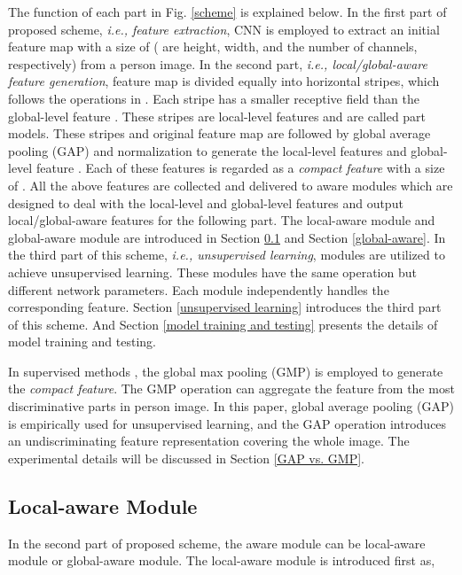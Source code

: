 \documentclass{cta-author}
\begin{document}
	The function of each part in Fig. \ref{scheme} is explained below. In the first part of proposed scheme, \textit{i.e., feature extraction}, CNN is employed to extract an initial feature map  with a size of  ( are height, width, and the number of channels, respectively) from a person image. In the second part, \textit{i.e., local/global-aware feature generation}, feature map  is divided equally into  horizontal stripes, which follows the operations in \cite{RN191} \cite{RN314} \cite{RN448}. Each stripe has a smaller receptive field than the global-level feature . These stripes are local-level features and are called part models. These stripes and original feature map are followed by global average pooling (GAP) and normalization to generate the local-level features  and global-level feature . Each of these features is regarded as a \textit{compact feature} with a size of . All the above features are collected and delivered to aware modules which are designed to deal with the local-level and global-level features and output local/global-aware features for the following part. The local-aware module and global-aware module are introduced in Section \ref{local-aware} and Section \ref{global-aware}. In the third part of this scheme, \textit{i.e., unsupervised learning},  modules are utilized to achieve unsupervised learning. These modules have the same operation but different network parameters. Each module independently handles the corresponding feature. Section \ref{unsupervised learning} introduces the third part of this scheme. And Section \ref{model training and testing} presents the details of model training and testing. 

	In supervised methods \cite{RN318} \cite{RN394}, the global max pooling (GMP) is employed to generate the \textit{compact feature}. The GMP operation can aggregate the feature from the most discriminative parts in person image. In this paper, global average pooling (GAP) is empirically used for unsupervised learning, and the GAP operation introduces an undiscriminating feature representation covering the whole image. The experimental details will be discussed in Section \ref{GAP vs. GMP}.
	
	\subsection{Local-aware Module} \label{local-aware}
	In the second part of proposed scheme, the aware module can be local-aware module or global-aware module. The local-aware module is introduced first as,
	
\end{document}
